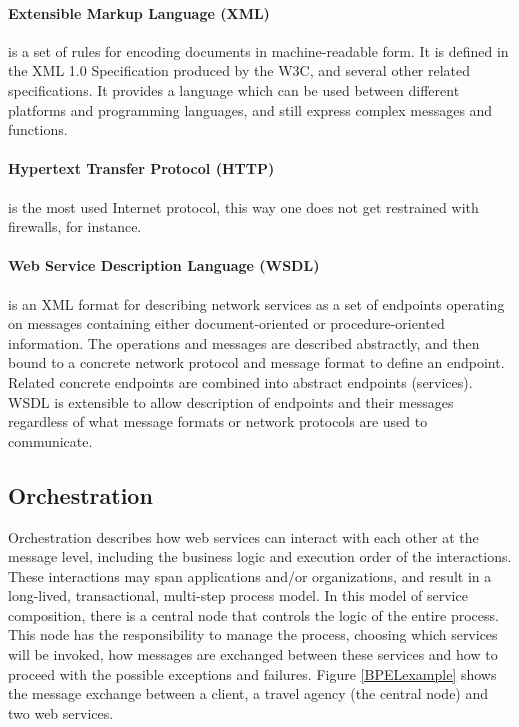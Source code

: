 \paragraph{Extensible Markup Language (XML)}
is a set of rules for encoding documents in machine-readable form. It is defined in the XML 1.0 Specification produced by the W3C, and several other related specifications. It provides a language which can be used between different platforms and programming languages, and still express complex messages and functions.

\paragraph{Hypertext Transfer Protocol (HTTP)} 
is the most used Internet protocol, this way one does not get restrained with firewalls, for instance.

\paragraph{Web Service Description Language (WSDL)}
is an XML format for describing network services as a set of endpoints operating on messages containing either document-oriented or procedure-oriented information. The operations and messages are described abstractly, and then bound to a concrete network protocol and message format to define an endpoint. Related concrete endpoints are combined into abstract endpoints (services). WSDL is extensible to allow description of endpoints and their messages regardless of what message formats or network protocols are used to communicate.

\subsection{Orchestration}
Orchestration describes how web services can interact with each other at the message level, including the business logic and execution order of the interactions. These interactions may span applications and/or organizations, and result in a long-lived, transactional, multi-step process model. In this model of service composition, there is a central node that controls the logic of the entire process. This node has the responsibility to manage the process, choosing which services will be invoked, how messages are exchanged between these services and how to proceed with the possible exceptions and failures. Figure \ref{BPELexample} shows the message exchange between a client, a travel agency (the central node) and two web services.

